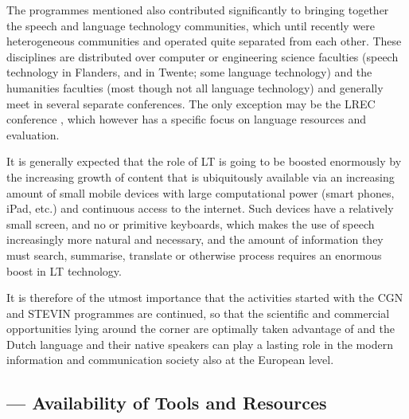 \documentclass{scrartcl}
\begin{document}
\begin{Parallel}[c]{70mm}{70mm}
{  The programmes mentioned also contributed significantly to bringing together the speech and language technology communities, which until recently were heterogeneous communities and operated quite separated from each other. These disciplines are distributed over computer or engineering science faculties (speech technology in Flanders, and in Twente; some language technology) and the humanities faculties (most though not all language technology) and generally meet in several separate conferences. The only exception may be the LREC conference \cite{LREC}, which however has a specific focus on language resources and evaluation.

  It is generally expected that the role of LT is going to be boosted enormously by the increasing growth of content that is ubiquitously available via an increasing amount of small mobile devices with large computational power (smart phones, iPad, etc.) and continuous access to the internet. Such devices have a relatively small screen, and no or primitive keyboards, which makes the use of speech increasingly more natural and necessary, and the amount of information they must search, summarise, translate or otherwise process requires an enormous boost in LT technology.

  It is therefore of the utmost importance that the activities started with the CGN and STEVIN programmes are continued, so that the scientific and commercial opportunities lying around the corner are optimally taken advantage of and the Dutch language and their native speakers can play a lasting role in the modern information and communication society also at the European level.

}

  \ParallelPar




  \subsection{ --- Availability of Tools and Resources}

  \MyParallelLText{


  }

\end{Parallel}
\end{document}
